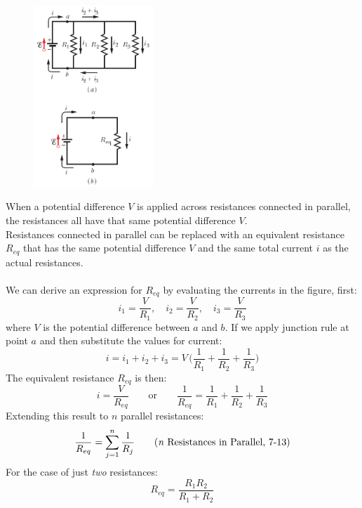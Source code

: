 \documentclass[12pt, a4paper]{article}
\begin{document}
		\begin{figure}
			\centering
			\includegraphics[width=4.5cm]{Physics2_PNGs/parallel-resistances.png}
			\caption*{}
			\label{fig:parallel-resistances.png}
		\end{figure}
		When a potential difference $V$ is applied across resistances connected in parallel, the resistances all have that same potential difference $V$. \\
		Resistances connected in parallel can be replaced with an equivalent resistance $R_{eq}$ that has the same potential difference $V$ and the same total current $i$ as the actual resistances.
		\\ \\
		We can derive an expression for $R_{eq}$ by evaluating the currents in the figure, first:
		\[
			i_1 = \frac{V}{R_1}, \quad i_2 = \frac{V}{R_2}, \quad i_3 = \frac{V}{R_3}
		\]
		where $V$ is the potential difference between $a$ and $b$. If we apply junction rule at point $a$ and then substitute the values for current:
		\[
			i = i_1 + i_2 + i_3 = V \, \biggl( \frac{1}{R_1} + \frac{1}{R_2} +
					                                    \frac{1}{R_3} \biggl)
			\tag{7-11}
		\]
		The equivalent resistance $R_{eq}$ is then:
		\[
			i = \frac{V}{R_{eq}} \quad \quad \text{or} \quad \quad
			\frac{1}{R_{eq}} = \frac{1}{R_1} + \frac{1}{R_2} + \frac{1}{R_3}
			\tag{7-12}
		\]
		Extending this result to $n$ parallel resistances:
		\[
			\frac{1}{R_{eq}} = \sum_{j=1}^{n} \frac{1}{R_j}
			\tag{\textit{n} Resistances in Parallel, 7-13}
		\]
		For the case of just \textit{two} resistances:
		\[
			R_{eq} = \frac{R_1 R_2}{R_1 + R_2}
			\tag{7-14}
		\]	
		\newpage
		
\end{document}
